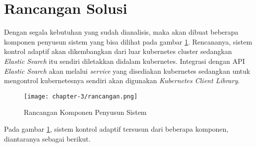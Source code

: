 \section{Rancangan Solusi}
Dengan segala kebutuhan yang sudah dianalisis, maka akan dibuat beberapa komponen penyusun sistem yang bisa dilihat pada gambar \ref{fig:rancangan-sistem}. Rencananya, sistem kontrol adaptif akan dikembangkan dari luar kubernetes cluster sedangkan \textit{Elastic Search} itu sendiri diletakkan didalam kubernetes. Integrasi dengan API \textit{Elastic Search} akan melalui \textit{service} yang disediakan kubernetes sedangkan untuk mengontrol kubernetesnya sendiri akan digunakan \textit{Kubernetes Client Library}.

\begin{figure}[h]
    \centering
    \texttt{[image: chapter-3/rancangan.png]}
    \caption{Rancangan Komponen Penyusun Sistem}
    \label{fig:rancangan-sistem}
\end{figure}

Pada gambar \ref{fig:rancangan-sistem}, sistem kontrol adaptif tersusun dari beberapa komponen, diantaranya sebagai berikut.

